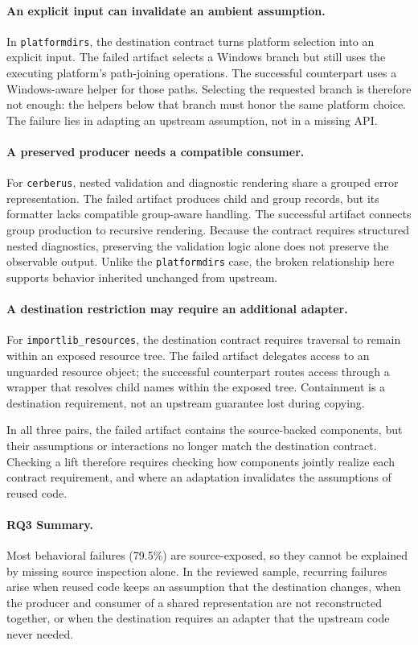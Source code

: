 \documentclass[acmsmall,screen,review,anonymous]{acmart}
\begin{document}
\paragraph{An explicit input can invalidate an ambient assumption.}
In \texttt{platformdirs}, the destination contract turns platform selection into
an explicit input. The failed artifact selects a Windows branch but still uses
the executing platform's path-joining operations. The successful counterpart uses a
Windows-aware helper for those paths. Selecting the requested branch is therefore
not enough: the helpers below that branch must honor the same platform choice.
The failure lies in adapting an upstream assumption, not in a missing API.

\paragraph{A preserved producer needs a compatible consumer.}
For \texttt{cerberus}, nested validation and diagnostic rendering share a grouped
error representation. The failed artifact produces child and group records,
but its formatter lacks compatible group-aware handling. The successful artifact
connects group production to recursive rendering. Because the contract requires
structured nested diagnostics, preserving the validation logic alone does not
preserve the observable output. Unlike the \texttt{platformdirs} case, the
broken relationship here supports behavior inherited unchanged from upstream.

\paragraph{A destination restriction may require an additional adapter.}
For \texttt{importlib\_resources}, the destination contract requires traversal to
remain within an exposed resource tree. The failed artifact delegates access to
an unguarded resource object; the successful counterpart routes access through
a wrapper that resolves child names within the exposed tree. Containment is a
destination requirement, not an upstream guarantee lost during copying.

In all three pairs, the failed artifact contains the source-backed components,
but their assumptions or interactions no longer match the destination contract.
Checking a lift therefore requires checking how components jointly realize each
contract requirement, and where an adaptation invalidates the assumptions of
reused code.

\paragraph{RQ3 Summary.}
Most behavioral failures (79.5\%) are source-exposed, so they cannot be
explained by missing source inspection alone. In the reviewed sample, recurring
failures arise when reused code keeps an assumption that the destination
changes, when the producer and consumer of a shared representation are not
reconstructed together, or when the destination requires an adapter that the
upstream code never needed.
\end{document}
